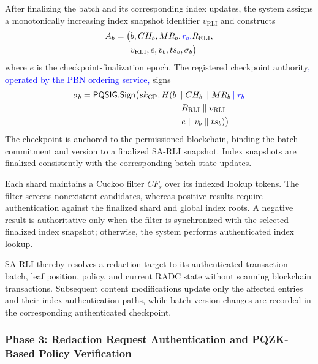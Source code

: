 \documentclass[lettersize,journal]{IEEEtran}
\begin{document}
After finalizing the batch and its corresponding
index updates, the system assigns a monotonically
increasing index snapshot identifier
$v_{\mathrm{RLI}}$ and constructs
\begin{equation}
\begin{aligned}
A_b=\big(&b,CH_b,MR_b,\textcolor{blue}{r_b,}R_{\mathrm{RLI}},\\&v_{\mathrm{RLI}},e,v_b,ts_b,\sigma_b\big)
\end{aligned}
\end{equation}
where $e$ is the checkpoint-finalization epoch.
The registered checkpoint authority\textcolor{blue}{, operated by the
PBN ordering service,} signs
\begin{equation}
\begin{aligned}
\sigma_b=
\mathsf{PQSIG.Sign}\big(
sk_{\mathrm{CP}},
H(&b\parallel CH_b\parallel MR_b\textcolor{blue}{\parallel r_b}\\
&\parallel R_{\mathrm{RLI}}\parallel v_{\mathrm{RLI}}\\
&\parallel e\parallel v_b\parallel ts_b)
\big)
\end{aligned}
\end{equation}
The checkpoint is anchored to the permissioned
blockchain, binding the batch commitment and
version to a finalized SA-RLI snapshot. Index
snapshots are finalized consistently with the
corresponding batch-state updates.

Each shard maintains a Cuckoo filter $CF_s$
over its indexed lookup tokens. The filter
screens nonexistent candidates, whereas
positive results require authentication
against the finalized shard and global index
roots. A negative result is authoritative
only when the filter is synchronized with
the selected finalized index snapshot;
otherwise, the system performs authenticated
index lookup.

SA-RLI thereby resolves a redaction target
to its authenticated transaction batch,
leaf position, policy, and current RADC
state without scanning blockchain transactions.
Subsequent content modifications update
only the affected entries and their index
authentication paths, while batch-version
changes are recorded in the corresponding
authenticated checkpoint.


\subsubsection*{\textbf{Phase 3: Redaction Request
Authentication and PQZK-Based Policy Verification}}
\end{document}
